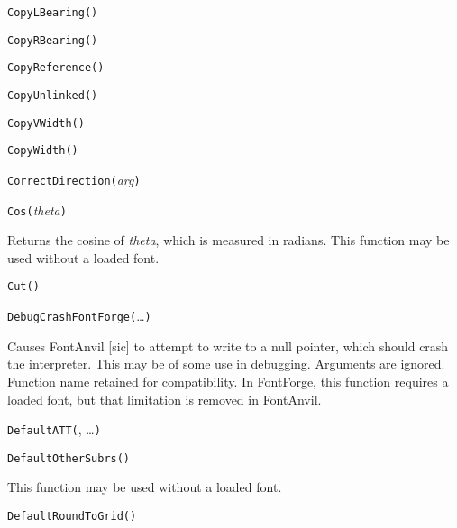 
\noindent\texttt{CopyLBearing(}\texttt{)}


\noindent\texttt{CopyRBearing(}\texttt{)}


\noindent\texttt{CopyReference(}\texttt{)}


\noindent\texttt{CopyUnlinked(}\texttt{)}


\noindent\texttt{CopyVWidth(}\texttt{)}


\noindent\texttt{CopyWidth(}\texttt{)}


\noindent\texttt{CorrectDirection(}\textit{arg}\texttt{)}


\noindent\texttt{Cos(}\textit{theta}\texttt{)}

Returns the cosine of \textit{theta}, which is measured in radians.
This function may be used without a loaded font.


\noindent\texttt{Cut(}\texttt{)}


\noindent\texttt{DebugCrashFontForge(}\ldots\texttt{)}

Causes FontAnvil [sic] to attempt to write to a null pointer, which should
crash the interpreter.  This may be of some use in debugging.  Arguments are
ignored.  Function name retained for compatibility.  In \FFdiff FontForge,
this function requires a loaded font, but that limitation is removed in
FontAnvil.


\noindent\texttt{DefaultATT(}, \ldots\texttt{)}


\noindent\texttt{DefaultOtherSubrs(}\texttt{)}

This function may be used without a loaded font.


\noindent\texttt{DefaultRoundToGrid(}\texttt{)}


